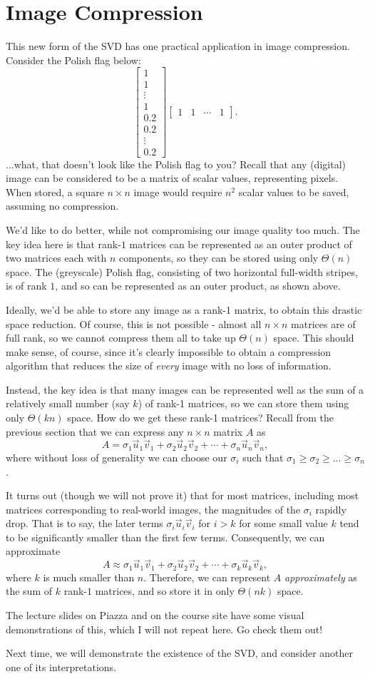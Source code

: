\documentclass[letterpaper]{article}
\theoremstyle{remark}
\newcommand{\mat}[1]{\ensuremath{\begin{bmatrix}#1\end{bmatrix}}}
\begin{document}
\section{Image Compression}
This new form of the SVD has one practical application in image compression. Consider the Polish flag below:
\[
    \mat{1 \\ 1 \\ \vdots \\ 1 \\ 0.2 \\ 0.2 \\ \vdots \\ 0.2} \mat{1 & 1 & \cdots & 1}.
\]
...what, that doesn't look like the Polish flag to you? Recall that any (digital) image can be considered to be a matrix of scalar values, representing pixels. When stored, a square $n\times n$ image would require $n^2$ scalar values to be saved, assuming no compression.

We'd like to do better, while not compromising our image quality too much. The key idea here is that rank-$1$ matrices can be represented as an outer product of two matrices each with $n$ components, so they can be stored using only $\Theta(n)$ space. The (greyscale) Polish flag, consisting of two horizontal full-width stripes, is of rank $1$, and so can be represented as an outer product, as shown above.

Ideally, we'd be able to store any image as a rank-1 matrix, to obtain this drastic space reduction. Of course, this is not possible - almost all $n \times n$ matrices are of full rank, so we cannot compress them all to take up $\Theta(n)$ space. This should make sense, of course, since it's clearly impossible to obtain a compression algorithm that reduces the size of \emph{every} image with no loss of information.

Instead, the key idea is that many images can be represented well as the sum of a relatively small number (say $k$) of rank-1 matrices, so we can store them using only $\Theta(kn)$ space. How do we get these rank-1 matrices? Recall from the previous section that we can express any $n\times n$ matrix $A$ as
\[
    A = \sigma_1 \vec{u}_1\vec{v}_1 + \sigma_2 \vec{u}_2\vec{v}_2 + \cdots + \sigma_n\vec{u}_n\vec{v}_n,
\]
where without loss of generality we can choose our $\sigma_i$ such that $\sigma_1 \ge \sigma_2 \ge \ldots \ge \sigma_n$.

It turns out (though we will not prove it) that for most matrices, including most matrices corresponding to real-world images, the magnitudes of the $\sigma_i$ rapidly drop. That is to say, the later terms $\sigma_i\vec{u}_i\vec{v}_i$ for $i > k$ for some small value $k$ tend to be significantly smaller than the first few terms. Consequently, we can approximate
\[
    A \approx \sigma_1 \vec{u}_1\vec{v}_1 + \sigma_2 \vec{u}_2\vec{v}_2 + \cdots + \sigma_k\vec{u}_k\vec{v}_k,
\]
where $k$ is much smaller than $n$. Therefore, we can represent $A$ \emph{approximately} as the sum of $k$ rank-$1$ matrices, and so store it in only $\Theta(nk)$ space.

The lecture slides on Piazza and on the course site have some visual demonstrations of this, which I will not repeat here. Go check them out!

Next time, we will demonstrate the existence of the SVD, and consider another one of its interpretations.
\end{document}
